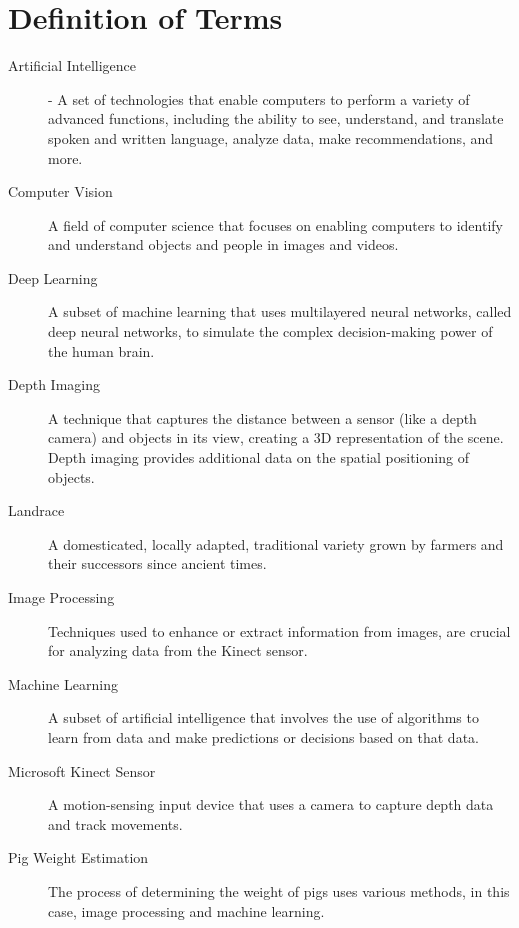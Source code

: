 {\section{Definition of Terms}

\begin{description}

	\item[Artificial Intelligence] -
	A set of technologies that enable computers to perform a variety of advanced functions, including the ability to see, understand, and translate spoken and written language, analyze data, make recommendations, and more.
	
	\item[Computer Vision] 
	A field of computer science that focuses on enabling computers to identify and understand objects and people in images and videos.
	
	\item[Deep Learning] 
	A subset of machine learning that uses multilayered neural networks, called deep neural networks, to simulate the complex decision-making power of the human brain.
	
	\item[Depth Imaging] 
	A technique that captures the distance between a sensor (like a depth camera) and objects in its view, creating a 3D representation of the scene. Depth imaging provides additional data on the spatial positioning of objects.
	
	\item[Landrace] 
	A domesticated, locally adapted, traditional variety grown by farmers and their successors since ancient times.
	
	\item[Image Processing] 
	Techniques used to enhance or extract information from images, are crucial for analyzing data from the Kinect sensor.
	
	\item[Machine Learning] 
	A subset of artificial intelligence that involves the use of algorithms to learn from data and make predictions or decisions based on that data.
	
	\item[Microsoft Kinect Sensor] 
	A motion-sensing input device that uses a camera to capture depth data and track movements.
	
	\item[Pig Weight Estimation] 
	The process of determining the weight of pigs uses various methods, in this case, image processing and machine learning.

\end{description}

}
